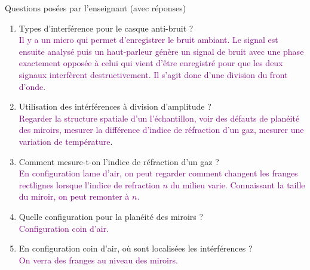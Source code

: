 \begin{reportBlock}{Questions posées par l’enseignant (avec réponses)}
  \begin{enumerate}
      \item Types d'interférence pour le casque anti-bruit ? \\ \textcolor{purple}{Il y a un micro qui permet d'enregistrer le bruit ambiant. Le signal est ensuite analysé puis un haut-parleur génère un signal de bruit avec une phase exactement opposée à celui qui vient d'être enregistré pour que les deux signaux interfèrent destructivement. Il s'agit donc d'une division du front d'onde.}
      
      \item Utilisation des intérférences à division d'amplitude ? \\
       \textcolor{purple}{Regarder la structure spatiale d'un l'échantillon, voir des défauts de planéité des miroirs, mesurer la différence d'indice de réfraction d'un gaz, mesurer une variation de température}. 
       
    \item Comment mesure-t-on l'indice de réfraction d'un gaz ? \\
       \textcolor{purple}{En configuration lame d'air, on peut regarder comment changent les franges rectlignes lorsque l'indice de refraction $n$ du milieu varie. Connaissant la taille du miroir, on peut remonter à $n$.}
       
      \item Quelle configuration pour la planéité des miroirs ? \\
       \textcolor{purple}{Configuration coin d'air.}
       
      \item En configuration coin d'air, où sont localisées les intérférences ? \\
       \textcolor{purple}{On verra des franges au niveau des miroirs.}
       

\end{enumerate}
\end{reportBlock}
